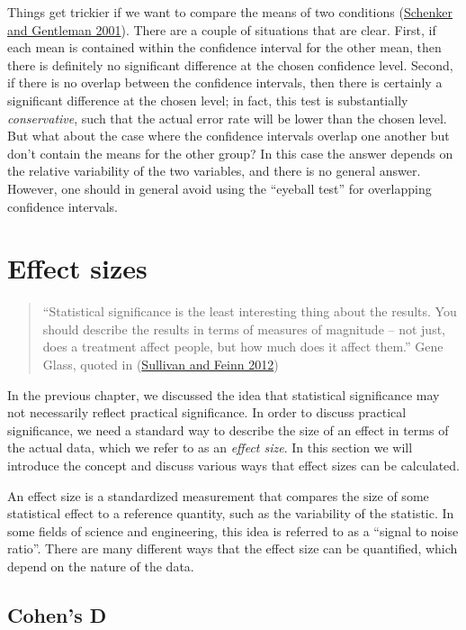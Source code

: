 \documentclass[
  12pt,
]{book}
\begin{document}
Things get trickier if we want to compare the means of two conditions (\protect\hyperlink{ref-sche:gent:2001}{Schenker and Gentleman 2001}). There are a couple of situations that are clear. First, if each mean is contained within the confidence interval for the other mean, then there is definitely no significant difference at the chosen confidence level. Second, if there is no overlap between the confidence intervals, then there is certainly a significant difference at the chosen level; in fact, this test is substantially \emph{conservative}, such that the actual error rate will be lower than the chosen level. But what about the case where the confidence intervals overlap one another but don't contain the means for the other group? In this case the answer depends on the relative variability of the two variables, and there is no general answer. However, one should in general avoid using the ``eyeball test'' for overlapping confidence intervals.

\hypertarget{effect-sizes}{%
\section{Effect sizes}\label{effect-sizes}}

\begin{quote}
``Statistical significance is the least interesting thing about the results. You should describe the results in terms of measures of magnitude -- not just, does a treatment affect people, but how much does it affect them.'' Gene Glass, quoted in (\protect\hyperlink{ref-Sullivan:2012ta}{Sullivan and Feinn 2012})
\end{quote}

In the previous chapter, we discussed the idea that statistical significance may not necessarily reflect practical significance. In order to discuss practical significance, we need a standard way to describe the size of an effect in terms of the actual data, which we refer to as an \emph{effect size}. In this section we will introduce the concept and discuss various ways that effect sizes can be calculated.

An effect size is a standardized measurement that compares the size of some statistical effect to a reference quantity, such as the variability of the statistic. In some fields of science and engineering, this idea is referred to as a ``signal to noise ratio''. There are many different ways that the effect size can be quantified, which depend on the nature of the data.

\hypertarget{cohens-d}{%
\subsection{Cohen's D}\label{cohens-d}}
\end{document}
